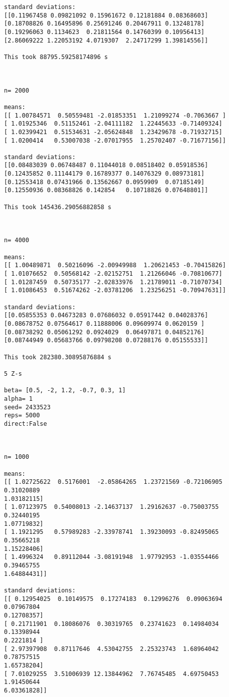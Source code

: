 \documentclass{article}
\theoremstyle{definition}
\theoremstyle{remark}
\begin{document}
\begin{verbatim}
standard deviations: 
[[0.11967458 0.09821092 0.15961672 0.12181884 0.08368603]
[0.18708826 0.16495896 0.25691246 0.20467911 0.13248178]
[0.19296063 0.1134623  0.21811564 0.14760399 0.10956413]
[2.86069222 1.22053192 4.0719307  2.24717299 1.39814556]]

This took 88795.59258174896 s



n= 2000

means: 
[[ 1.00784571  0.50559481 -2.01853351  1.21099274 -0.7063667 ]
[ 1.01925346  0.51152461 -2.04111182  1.22445633 -0.71409324]
[ 1.02399421  0.51534631 -2.05624848  1.23429678 -0.71932715]
[ 1.0200414   0.53007038 -2.07017955  1.25702407 -0.71677156]]

standard deviations: 
[[0.08483039 0.06748487 0.11044018 0.08518402 0.05918536]
[0.12435852 0.11144179 0.16789377 0.14076329 0.08973181]
[0.12553418 0.07431966 0.13562667 0.0959909  0.07185149]
[0.12550936 0.08368826 0.142854   0.10718826 0.07648801]]

This took 145436.29056882858 s



n= 4000

means: 
[[ 1.00489871  0.50216096 -2.00949988  1.20621453 -0.70415826]
[ 1.01076652  0.50568142 -2.02152751  1.21266046 -0.70810677]
[ 1.01287459  0.50735177 -2.02833976  1.21789011 -0.71070734]
[ 1.01086453  0.51674262 -2.03781206  1.23256251 -0.70947631]]

standard deviations: 
[[0.05855353 0.04673283 0.07686032 0.05917442 0.04028376]
[0.08678752 0.07564617 0.11888006 0.09609974 0.0620159 ]
[0.08738292 0.05061292 0.0924029  0.06497871 0.04852176]
[0.08744949 0.05683766 0.09798208 0.07288176 0.05155533]]

This took 282380.30895876884 s

5 Z-s

beta= [0.5, -2, 1.2, -0.7, 0.3, 1]
alpha= 1
seed= 2433523
reps= 5000
direct:False



n= 1000

means: 
[[ 1.02725622  0.5176001  -2.05864265  1.23721569 -0.72106905  0.31020889
1.03182115]
[ 1.07123975  0.54008013 -2.14637137  1.29162637 -0.75003755  0.32440195
1.07719832]
[ 1.1921295   0.57989283 -2.33978741  1.39230093 -0.82495065  0.35665218
1.15228406]
[ 1.4996324   0.89112044 -3.08191948  1.97792953 -1.03554466  0.39465755
1.64884431]]

standard deviations: 
[[ 0.12954025  0.10149575  0.17274183  0.12996276  0.09063694  0.07967804
0.12708357]
[ 0.21711901  0.18086076  0.30319765  0.23741623  0.14984034  0.13398944
0.2221814 ]
[ 2.97397908  0.87117646  4.53042755  2.25323743  1.68964042  0.78757515
1.65738204]
[ 7.01029255  3.51006939 12.13844962  7.76745485  4.69750453  1.91450644
6.03361828]]


\end{verbatim}
\end{document}
